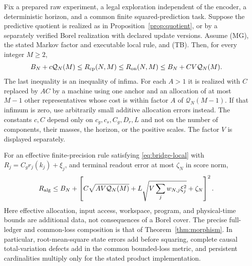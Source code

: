 \begin{theorem}\label{thm:bridge}
Fix a prepared raw experiment, a legal exploration independent of the encoder, a deterministic horizon, and a common finite squared-prediction task. Suppose the predictive quotient is realized as in Proposition~\ref{prop:quotient}, or by a separately verified Borel realization with declared update versions. Assume \textup{(MG)}, the stated Markov factor and executable local rule, and \textup{(TB)}. Then, for every integer $M\ge2$,
\begin{equation}\label{eq:bridge-main}
 B_N+c\mathcal Q_N(M)\le R_{\mathrm{cp}}(N,M)\le R_{\mathrm{on}}(N,M)
       \le B_N+C V\mathcal Q_N(M).
\end{equation}
The last inequality is an inequality of infima. For each $A>1$ it is realized with $C$ replaced by $AC$ by a machine using one anchor and an allocation of at most $M-1$ other representatives whose cost is within factor $A$ of $\mathcal Q_N(M-1)$. If that infimum is zero, use arbitrarily small additive allocation errors instead. The constants $c,C$ depend only on $c_g,c_s,C_g,D_r,L$ and not on the number of components, their masses, the horizon, or the positive scales. The factor $V$ is displayed separately.

For an effective finite-precision rule satisfying \eqref{eq:bridge-local} with $R_j=C_g r_j(k_j)+\xi_j$, and terminal readout error at most $\zeta_N$ in score norm,
\begin{equation}\label{eq:bridge-finite}
 R_{\rm alg}\le B_N+
 \left[C\sqrt{A V\mathcal Q_N(M)}
       +L\sqrt{V\sum_jw_{N,j}\xi_j^2}+\zeta_N\right]^2.
\end{equation}
Here effective allocation, input access, workspace, program, and physical-time bounds are additional data, not consequences of a Borel cover. The precise full-ledger and common-loss composition is that of Theorem~\ref{thm:morphism}. In particular, root-mean-square state errors add before squaring, complete causal total-variation defects add in the common bounded-loss metric, and persistent cardinalities multiply only for the stated product implementation.
\end{theorem}


